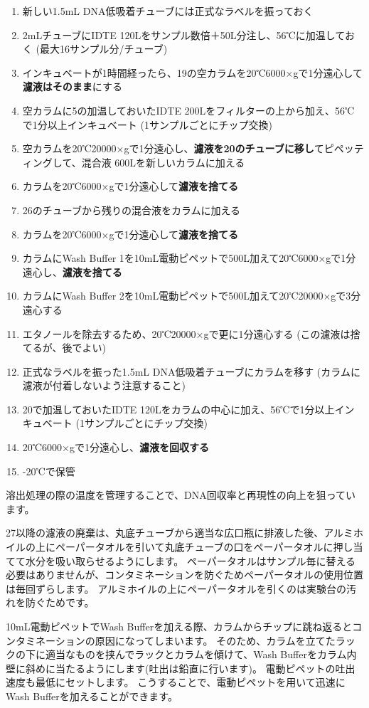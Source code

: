 \documentclass[titlepage,10pt,a4paper,uplatex]{jsbook}
\renewcommand{\textbf}[1]{{\bfseries\sffamily#1}}
\begin{document}
\begin{enumerate}
\item 新しい1.5mL DNA低吸着チューブには正式なラベルを振っておく
\item 2mLチューブにIDTE 120{\textmu}Lをサンプル数倍＋50{\textmu}L分注し、56℃に加温しておく (最大16サンプル分/チューブ)
\item インキュベートが1時間経ったら、19の空カラムを20℃6000×gで1分遠心して\textbf{濾液はそのまま}にする
\item 空カラムに5の加温しておいたIDTE 200{\textmu}Lをフィルターの上から加え、56℃で1分以上インキュベート (1サンプルごとにチップ交換)
\item 空カラムを20℃20000×gで1分遠心し、\textbf{濾液を20のチューブに移し}てピペッティングして、混合液 600{\textmu}Lを新しいカラムに加える
\item カラムを20℃6000×gで1分遠心して\textbf{濾液を捨てる}
\item 26のチューブから残りの混合液をカラムに加える
\item カラムを20℃6000×gで1分遠心して\textbf{濾液を捨てる}
\item カラムにWash Buffer 1を10mL電動ピペットで500{\textmu}L加えて20℃6000×gで1分遠心し、\textbf{濾液を捨てる}
\item カラムにWash Buffer 2を10mL電動ピペットで500{\textmu}L加えて20℃20000×gで3分遠心する
\item エタノールを除去するため、20℃20000×gで更に1分遠心する (この濾液は捨てるが、後でよい)
\item 正式なラベルを振った1.5mL DNA低吸着チューブにカラムを移す (カラムに濾液が付着しないよう注意すること)
\item 20で加温しておいたIDTE 120{\textmu}Lをカラムの中心に加え、56℃で1分以上インキュベート (1サンプルごとにチップ交換)
\item 20℃6000×gで1分遠心し、\textbf{濾液を回収する}
\item -20℃で保管
\end{enumerate}

溶出処理の際の温度を管理することで、DNA回収率と再現性の向上を狙っています。

27以降の濾液の廃棄は、丸底チューブから適当な広口瓶に排液した後、アルミホイルの上にペーパータオルを引いて丸底チューブの口をペーパータオルに押し当てて水分を吸い取らせるようにします。
ペーパータオルはサンプル毎に替える必要はありませんが、コンタミネーションを防ぐためペーパータオルの使用位置は毎回ずらします。
アルミホイルの上にペーパータオルを引くのは実験台の汚れを防ぐためです。

10mL電動ピペットでWash Bufferを加える際、カラムからチップに跳ね返るとコンタミネーションの原因になってしまいます。
そのため、カラムを立てたラックの下に適当なものを挟んでラックとカラムを傾けて、Wash Bufferをカラム内壁に斜めに当たるようにします(吐出は鉛直に行います)。
電動ピペットの吐出速度も最低にセットします。
こうすることで、電動ピペットを用いて迅速にWash Bufferを加えることができます。
\end{document}
